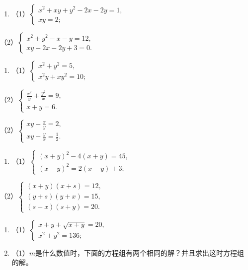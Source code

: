 \begin{enumerate}[start=4]
\item
  （1）\(\left\{ \begin{array}{l} x^{2} + xy + y^{2} - 2x - 2y = 1, \\ xy = 2; \end{array} \right.\)
\end{enumerate}

（2）\(\left\{ \begin{array}{l} x^{2} + y^{2} - x - y = 12, \\ xy - 2x - 2y + 3 = 0. \end{array} \right.\)

\begin{enumerate}[start=5]
\item
  （1）\(\left\{ \begin{array}{l} x^{2} + y^{2} = 5, \\ x^{2}y + xy^{2} = 10; \end{array} \right.\)
\end{enumerate}

（2）\(\left\{ \begin{array}{l} \frac{x^2}{y} + \frac{y^2}{x} = 9, \\ x + y = 6. \end{array} \right.\)

（2）\(\left\{ \begin{array}{l} xy - \frac{x}{y} = 2, \\ xy - \frac{y}{x} = \frac{1}{2}. \end{array} \right.\)

\begin{enumerate}[start=6]
\item
  （1）\(\left\{ \begin{array}{l} (x + y)^2 - 4(x + y) = 45, \\ (x - y)^2 = 2(x - y) + 3; \end{array} \right.\)
\end{enumerate}

（2）\(\left\{ \begin{array}{l} (x + y)(x + s) = 12, \\ (y + s)(y + x) = 15, \\ (s + x)(s + y) = 20. \end{array} \right.\)

\begin{enumerate}[start=7]
\item
  （1）\(\left\{ \begin{array}{l} x + y + \sqrt{x + y} = 20, \\ x^2 + y^2 = 136; \end{array} \right.\)
\item
  （1）\(m\)是什么数值时，下面的方程组有两个相同的解？并且求出这时方程组的解。
\end{enumerate}

